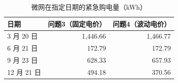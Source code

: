 \begin{table}[H]\centering\small
\caption{微网在指定日期的紧急购电量（kWh）}\label{tab:p4t3}
\begin{tabular}{lrr}
\toprule
日期 & 问题3（固定电价） & 问题4（波动电价）\\
\midrule
3 月 20 日 & 1,446.66 & 1,466.77\\
6 月 21 日 & 172.79 & 172.79\\
9 月 23 日 & 628.33 & 657.93\\
12 月 21 日 & 494.18 & 370.56\\
\bottomrule\end{tabular}\end{table}